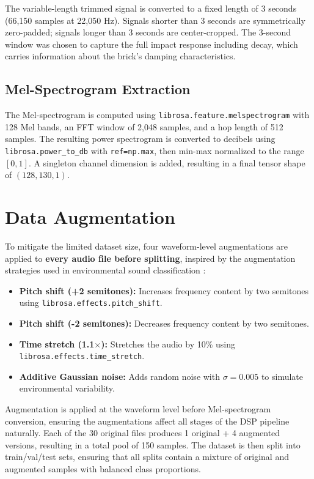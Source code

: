 \documentclass[12pt,a4paper,oneside]{report}
\begin{document}
The variable-length trimmed signal is converted to a fixed length of 3 seconds (66,150 samples at 22,050 Hz). Signals shorter than 3 seconds are symmetrically zero-padded; signals longer than 3 seconds are center-cropped. The 3-second window was chosen to capture the full impact response including decay, which carries information about the brick's damping characteristics.

\subsection{Mel-Spectrogram Extraction}

The Mel-spectrogram is computed using \texttt{librosa.feature.melspectrogram} with 128 Mel bands, an FFT window of 2,048 samples, and a hop length of 512 samples. The resulting power spectrogram is converted to decibels using \texttt{librosa.power\_to\_db} with \texttt{ref=np.max}, then min-max normalized to the range \([0, 1]\). A singleton channel dimension is added, resulting in a final tensor shape of \((128, 130, 1)\).

\section{Data Augmentation}

To mitigate the limited dataset size, four waveform-level augmentations are applied to \textbf{every audio file before splitting}, inspired by the augmentation strategies used in environmental sound classification \cite{sbcnn2016}:
\begin{itemize}
    \item \textbf{Pitch shift (+2 semitones):} Increases frequency content by two semitones using \texttt{librosa.effects.pitch\_shift}.
    \item \textbf{Pitch shift (-2 semitones):} Decreases frequency content by two semitones.
    \item \textbf{Time stretch (1.1$\times$):} Stretches the audio by 10\% using \texttt{librosa.effects.time\_stretch}.
    \item \textbf{Additive Gaussian noise:} Adds random noise with \(\sigma = 0.005\) to simulate environmental variability.
\end{itemize}
Augmentation is applied at the waveform level before Mel-spectrogram conversion, ensuring the augmentations affect all stages of the DSP pipeline naturally. Each of the 30 original files produces 1 original + 4 augmented versions, resulting in a total pool of 150 samples. The dataset is then split into train/val/test sets, ensuring that all splits contain a mixture of original and augmented samples with balanced class proportions.
\end{document}
